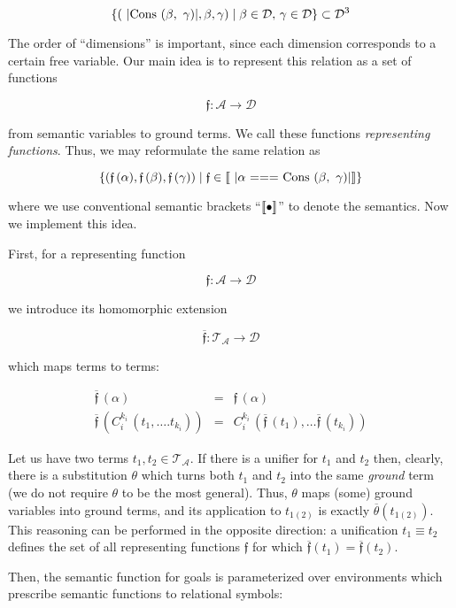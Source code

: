 \[
\{(\mbox{\lstinline|Cons ($\beta$, $\,\gamma$)|}, \beta, \gamma) \mid \beta\in\mathcal{D},\,\gamma\in\mathcal{D}\}\subset\mathcal{D}^3
\]

The order of ``dimensions'' is important, since each dimension corresponds to a certain free variable. Our main idea is to represent this relation as a set of functions 

\[
\mathfrak{f}:\mathcal{A}\to\mathcal{D}
\]

from semantic variables to ground terms. We call these functions \emph{representing functions}. Thus, we may reformulate the same relation as

\[
\{(\mathfrak{f}\,(\alpha),\mathfrak{f}\,(\beta),\mathfrak{f}\,(\gamma))\mid\mathfrak{f}\in\sembr{\mbox{\lstinline|$\alpha$ === Cons ($\beta$, $\,\gamma$)|}}\}
\]

where we use conventional semantic brackets ``$\llbracket{\bullet}\rrbracket$'' to denote the semantics. Now we implement this idea.

First, for a representing function

\[
\mathfrak{f} : \mathcal{A}\to\mathcal{D}
\]

we introduce its homomorphic extension 

\[
  \overline{\mathfrak{f}}:\mathcal{T_A}\to\mathcal{D}
\]

which maps terms to terms:

\[
\begin{array}{rcl}

  \overline{\mathfrak f}\,(\alpha) & = & \mathfrak f\,(\alpha)\\
  \overline{\mathfrak f}\,(C_i^{k_i}\,(t_1,\dots.t_{k_i})) & = & C_i^{k_i}\,(\overline{\mathfrak f}\,(t_1),\dots \overline{\mathfrak f}\,(t_{k_i}))
\end{array}
\]

Let us have two terms $t_1, t_2\in\mathcal{T_A}$. If there is a unifier for $t_1$ and $t_2$ then, clearly, there is a substitution $\theta$ which
turns both $t_1$ and $t_2$ into the same \emph{ground} term (we do not require $\theta$ to be the most general). Thus, $\theta$ maps
(some) ground variables into ground terms, and its application to $t_{1(2)}$ is exactly $\overline{\theta}(t_{1(2)})$. This reasoning can be
performed in the opposite direction: a unification $t_1\equiv t_2$ defines the set of all representing functions $\mathfrak{f}$ for which
$\overline{\mathfrak{f}}(t_1)=\overline{\mathfrak{f}}(t_2)$. 

Then, the semantic function for goals is parameterized over environments which prescribe semantic functions to relational symbols:

